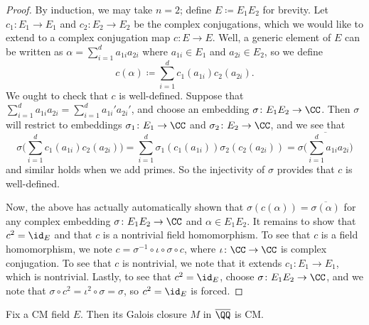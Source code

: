 \documentclass[../notes.tex]{subfiles}
\begin{document}
\begin{proof}
	By induction, we may take $n=2$; define $E\coloneqq E_1E_2$ for brevity. Let $c_1\colon E_1\to E_1$ and $c_2\colon E_2\to E_2$ be the complex conjugations, which we would like to extend to a complex conjugation map $c\colon E\to E$. Well, a generic element of $E$ can be written as $\alpha=\sum_{i=1}^da_{1i}a_{2i}$ where $a_{1i}\in E_1$ and $a_{2i}\in E_2$, so we define
	\[c(\alpha)\coloneqq\sum_{i=1}^dc_1(a_{1i})c_2(a_{2i}).\]
	We ought to check that $c$ is well-defined. Suppose that $\sum_{i=1}^da_{1i}a_{2i}=\sum_{i=1}^da_{1i}'a_{2i}'$, and choose an embedding $\sigma\colon E_1E_2\to\CC$. Then $\sigma$ will restrict to embeddings $\sigma_1\colon E_1\to\CC$ and $\sigma_2\colon E_2\to\CC$, and we see that
	\[\sigma\Bigg(\sum_{i=1}^dc_1(a_{1i})c_2(a_{2i})\Bigg)=\sum_{i=1}^d\sigma_1(c_1(a_{1i}))\sigma_2(c_2(a_{2i}))=\overline{\sigma\Bigg(\sum_{i=1}^da_{1i}a_{2i}\Bigg)}\]
	and similar holds when we add primes. So the injectivity of $\sigma$ provides that $c$ is well-defined.

	Now, the above has actually automatically shown that $\sigma(c(\alpha))=\overline{\sigma(\alpha)}$ for any complex embedding $\sigma\colon E_1E_2\to\CC$ and $\alpha\in E_1E_2$. It remains to show that $c^2=\id_E$ and that $c$ is a nontrivial field homomorphism. To see that $c$ is a field homomorphism, we  note $c=\sigma^{-1}\circ\iota\circ\sigma\circ c$, where $\iota\colon\CC\to\CC$ is complex conjugation. To see that $c$ is nontrivial, we note that it extends $c_1\colon E_1\to E_1$, which is nontrivial. Lastly, to see that $c^2=\id_E$, choose $\sigma\colon E_1E_2\to\CC$, and we note that $\sigma\circ c^2=\iota^2\circ\sigma=\sigma$, so $c^2=\id_E$ is forced.
\end{proof}
\begin{corollary}
	Fix a CM field $E$. Then its Galois closure $M$ in $\overline\QQ$ is CM.
\end{corollary}
\end{document}
